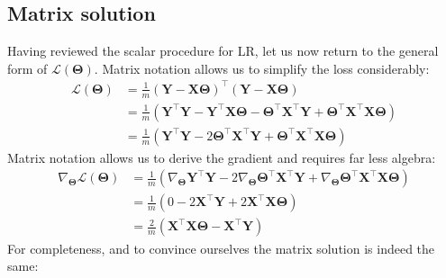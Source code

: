 \subsection{Matrix solution}\label{sec:linreg_matrix_sol}

Having reviewed the scalar procedure for LR, let us now return to the general form of $\mathcal L(\bm\Theta)$. Matrix notation allows us to simplify the loss considerably:
%
\begin{align}
\mathcal L(\bm\Theta) & = \frac{1}{m} (\mathbf Y - \mathbf X \bm\Theta)^\intercal(\mathbf Y - \mathbf X \bm\Theta) \\ &= \frac{1}{m} (\mathbf Y^\intercal \mathbf Y - \mathbf Y^\intercal \mathbf X \bm\Theta - \bm\Theta^\intercal \mathbf X^\intercal \mathbf Y + \bm\Theta^\intercal \mathbf X^\intercal \mathbf X \bm\Theta) \\ &= \frac{1}{m} (\mathbf Y^\intercal \mathbf Y - 2 \bm\Theta^\intercal \mathbf X^\intercal \mathbf Y + \bm\Theta^\intercal \mathbf X^\intercal \mathbf X \bm\Theta)
\end{align}
%
Matrix notation allows us to derive the gradient and requires far less algebra:
%
\begin{align}
\nabla_{\bm\Theta}\mathcal L(\bm\Theta) & = \frac{1}{m} (\nabla_{\bm\Theta}\mathbf Y^\intercal \mathbf Y - 2 \nabla_{\bm\Theta} \bm\Theta^\intercal \mathbf X^\intercal \mathbf Y + \nabla_{\bm\Theta}\bm\Theta^\intercal \mathbf X^\intercal \mathbf X \bm\Theta) \\ & = \frac{1}{m} ( 0 - 2\mathbf{X}^\intercal \mathbf Y + 2 \mathbf{X}^\intercal \mathbf X \bm\Theta ) \\ & = \boxed{\frac{2}{m} (\mathbf{X}^\intercal \mathbf X \bm\Theta - \mathbf{X}^\intercal \mathbf Y)}
\end{align}
%
For completeness, and to convince ourselves the matrix solution is indeed the same:
%
